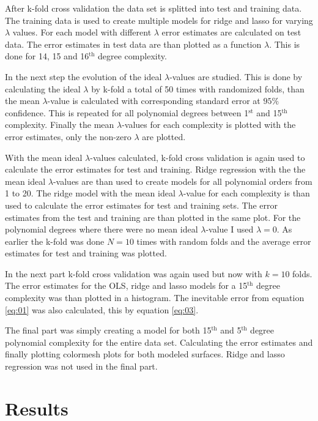 \documentclass[uio,jmp,amsmath,amssymb,reprint,nofootinbib]{revtex4-1}
\numberwithin{equation}{section}
\begin{document}
After k-fold cross validation the data set is splitted into test and training data. The training data is used to create multiple models for ridge and lasso for varying \(\lambda\) values. For each model with different \(\lambda\) error estimates are calculated on test data. The error estimates in test data are than plotted as a function   \(\lambda\). This is done for 14, 15 and 16\(^\text{th}\) degree complexity.

In the next step the evolution of the ideal \(\lambda\)-values are studied. This is done by calculating the ideal \(\lambda\) by k-fold a total of 50 times with randomized folds, than the mean \(\lambda\)-value is calculated with corresponding standard error at \(95\%\) confidence. This is repeated for all polynomial degrees between 1\(^\text{st}\) and 15\(^\text{th}\) complexity. Finally the mean \(\lambda\)-values for each complexity is plotted with the error estimates, only the non-zero \(\lambda\) are plotted.

With the mean ideal \(\lambda\)-values calculated, k-fold cross validation is again used to calculate the error estimates for test and training. Ridge regression with the the mean ideal \(\lambda\)-values are than used to create models for all polynomial orders from 1 to 20. The ridge model with the mean ideal \(\lambda\)-value for each complexity is than used to calculate the error estimates for test and training sets. The error estimates from the test and training are than plotted in the same plot. For the polynomial degrees where there were no mean ideal \(\lambda\)-value I used \(\lambda = 0\). As earlier the k-fold was done \(N=10\) times with random folds and the average error estimates for test and training was plotted.

In the next part k-fold cross validation was again used but now with \(k=10\) folds. The error estimates for the OLS, ridge and lasso models for a 15\(^\text{th}\) degree complexity was than plotted in a histogram. The inevitable error from equation \ref{eq:01} was also calculated, this by equation \ref{eq:03}.

The final part was simply creating a model for both 15\(^\text{th}\) and 5\(^\text{th}\) degree polynomial complexity for the entire data set. Calculating the error estimates and finally plotting colormesh plots for both modeled surfaces. Ridge and lasso regression was not used in the final part.


\section{Results}\label{sec:Results}
\end{document}

